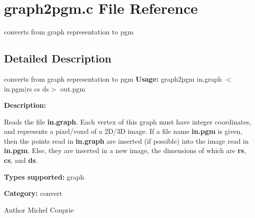 \section{graph2pgm.c File Reference}
\label{graph2pgm_8c}


converts from graph representation to pgm  




\subsection{Detailed Description}
converts from graph representation to pgm {\bfseries Usage:} graph2pgm in.graph $<$in.pgm$|$rs cs ds$>$ out.pgm

{\bfseries Description:}

Reads the file {\bfseries in.graph}. Each vertex of this graph must have integer coordinates, and represents a pixel/voxel of a 2D/3D image. If a file name {\bfseries in.pgm} is given, then the points read in {\bfseries in.graph} are inserted (if possible) into the image read in {\bfseries in.pgm}. Else, they are inserted in a new image, the dimensions of which are {\bfseries rs}, {\bfseries cs}, and {\bfseries ds}.

{\bfseries Types supported:} graph

{\bfseries Category:} convert

\begin{DoxyAuthor}{Author}
Michel Couprie 
\end{DoxyAuthor}
